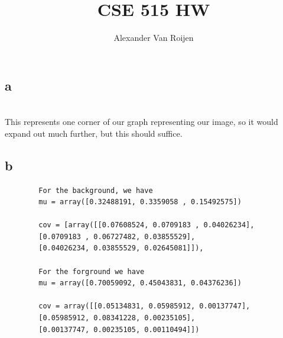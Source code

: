 \documentclass[12pt]{article}
\begin{document}
	
\title{%
	CSE 515 HW }

\author{ Alexander Van Roijen}

\maketitle	
	
\begin{section}{4.6}
	\subsection{a}
	\\

	This represents one corner of our graph representing our image, so it would expand out much further, but this should suffice.
	\subsection{b}
	\begin{verbatim}
		For the background, we have
		mu = array([0.32488191, 0.3359058 , 0.15492575])	

		cov = [array([[0.07608524, 0.0709183 , 0.04026234],
		[0.0709183 , 0.06727482, 0.03855529],
		[0.04026234, 0.03855529, 0.02645081]]), 
		
		For the forground we have
		mu = array([0.70059092, 0.45043831, 0.04376236])
		
		cov = array([[0.05134831, 0.05985912, 0.00137747],
		[0.05985912, 0.08341228, 0.00235105],
		[0.00137747, 0.00235105, 0.00110494]])
	\end{verbatim}


\end{section}
\end{document}
